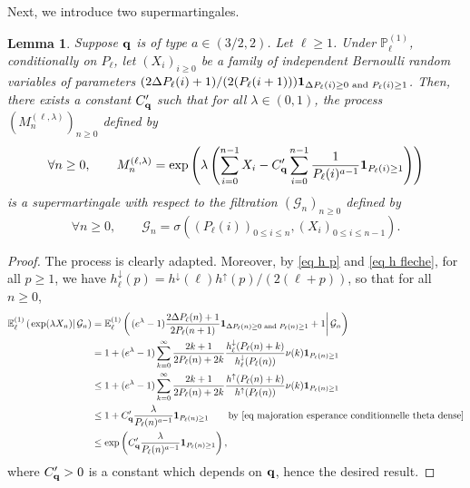 \documentclass[11pt]{article}
\newtheorem{lemma}[theorem]{Lemma}
\numberwithin{equation}{section}
\def\E{\mathbb{E}}
\def\P{\mathbb{P}}
\begin{document}
Next, we introduce two supermartingales.
\begin{lemma}\label{lemme martingale 1}
	Suppose ${\bf q}$ is of type $a \in (3/2,2)$. Let $\ell \ge 1$. Under $\P^{(1)}_\ell$, conditionally on $P_\ell$, let $(X_i)_{i\ge 0}$ be a family of independent Bernoulli random variables of parameters $(2\Delta P_\ell(i)+1)/(2(P_\ell(i+1))){\bf 1}_{\Delta P_\ell(i) \ge 0 \text{ and } P_\ell(i) \ge 1}$. Then, there exists a constant $C_{\bf q}'$ such that for all $\lambda \in (0,1)$, the process $(M_n^{(\ell,\lambda)})_{n\ge 0}$ defined by
	$$
	\forall n \ge 0, \qquad
	M_n^{(\ell,\lambda)} =
	\exp\left(\lambda \left(
	\sum_{i=0}^{n-1} X_i
	-C'_{\bf q} \sum_{i=0}^{n-1} \frac{1}{P_\ell(i)^{a-1}}{\bf 1}_{P_\ell(i) \ge 1}
	\right)
	\right)
	$$
	is a supermartingale with respect to the filtration $(\mathcal{G}_n)_{n\ge 0}$ defined by
	$$
	\forall n \ge 0, \qquad
	\mathcal{G}_n =
	\sigma\left(
	(P_\ell(i))_{0\le i \le n}, (X_i)_{0\le i \le n-1}
	\right).
	$$
\end{lemma}
\begin{proof}
	The process is clearly adapted. Moreover, by \eqref{eq h p} and \eqref{eq h fleche}, for all $p\ge 1$, we have $h^\downarrow_\ell(p) = h^\downarrow(\ell) h^\uparrow(p)/(2(\ell+p))$, so that for all $n\ge 0$, 
	\begin{align*}
		\E^{(1)}_\ell\left(
		\left.
		\exp(\lambda X_n)
		\right\vert
		\mathcal{G}_{n}
		\right)
		&=
		\E^{(1)}_\ell \left(
		\left.
		(e^\lambda-1) \frac{2 \Delta P_\ell(n)+1}{2P_\ell(n+1)} {\bf 1}_{\Delta P_\ell(n)\ge 0 \text{ and } P_\ell(n) \ge 1}
		+1
		\right\vert
		\mathcal{G}_{n}
		\right) \\
		&= 1 + (e^\lambda -1)
		\sum_{k= 0}^\infty
		\frac{2k+1}{2P_\ell(n)+2k} \frac{h^\downarrow_\ell(P_\ell(n)+k)}{h^\downarrow_\ell(P_\ell(n))} \nu(k) {\bf 1}_{P_\ell(n) \ge 1}\\
		& \le 1 + (e^\lambda -1)
		\sum_{k= 0}^\infty
		\frac{2k+1}{2P_\ell(n)+2k} \frac{h^\uparrow(P_\ell(n)+k)}{h^\uparrow(P_\ell(n))} \nu(k) {\bf 1}_{P_\ell(n) \ge 1}\\
		& \le 1 + C'_{\bf q} \frac{\lambda}{P_\ell(n)^{a-1}} {\bf 1}_{P_\ell(n) \ge 1} \qquad \text{by \eqref{eq majoration esperance conditionnelle theta dense}} \\
		& \le \exp \left( C'_{\bf q} \frac{\lambda}{P_\ell(n)^{a-1}}{\bf 1}_{P_\ell(n) \ge 1}\right),
	\end{align*}
where $C'_{\bf q}>0$ is a constant which depends on $\bf q$, hence the desired result.
\end{proof}
\end{document}
